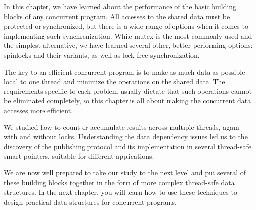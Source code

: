 In this chapter, we have learned about the performance of the basic building blocks of any concurrent program. All accesses to the shared data must be protected or synchronized, but there is a wide range of options when it comes to implementing such synchronization. While mutex is the most commonly used and the simplest alternative, we have learned several other, better-performing options: spinlocks and their variants, as well as lock-free synchronization.

The key to an efficient concurrent program is to make as much data as possible local to one thread and minimize the operations on the shared data. The requirements specific to each problem usually dictate that such operations cannot be eliminated completely, so this chapter is all about making the concurrent data accesses more efficient.

We studied how to count or accumulate results across multiple threads, again with and without locks. Understanding the data dependency issues led us to the discovery of the publishing protocol and its implementation in several thread-safe smart pointers, suitable for different applications. 

We are now well prepared to take our study to the next level and put several of these building blocks together in the form of more complex thread-safe data structures. In the next chapter, you will learn how to use these techniques to design practical data structures for concurrent programs.
